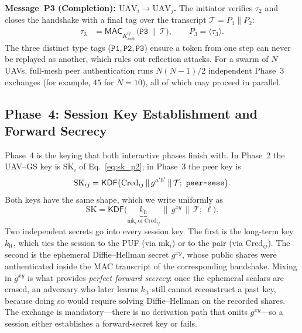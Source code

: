 \documentclass[11pt,a4paper]{article}
\begin{document}
\textbf{Message~P3 (Completion): $\text{UAV}_i \rightarrow \text{UAV}_j$.}
The initiator verifies $\tau_2$ and closes the handshake with a final tag over
the transcript $\mathcal{T}=P_1\|P_2$:
\begin{align}
\tau_3 &= \mathsf{MAC}_{K^{ij}_{\text{auth}}}\big(\texttt{P3}\,\|\,\mathcal{T}\big), \qquad
P_3 = \langle \tau_3 \rangle.
\end{align}
The three distinct type tags ($\texttt{P1},\texttt{P2},\texttt{P3}$) ensure a
token from one step can never be replayed as another, which rules out
reflection attacks. For a swarm of $N$ UAVs, full-mesh peer authentication runs
$N(N-1)/2$ independent Phase~3 exchanges (for example, $45$ for $N=10$), all of
which may proceed in parallel.

\subsection{Phase~4: Session Key Establishment and Forward Secrecy}
\label{subsec:phase4}

Phase~4 is the keying that both interactive phases finish with. In Phase~2 the
UAV--GS key is $\text{SK}_i$ of Eq.~\eqref{eq:sk_p2}; in Phase~3 the peer key is
\begin{equation}
\text{SK}_{ij} = \mathsf{KDF}\big(\text{Cred}_{ij}\,\|\,g^{a'b'}\,\|\,\mathcal{T};\ \texttt{peer\text{-}sess}\big).
\label{eq:sk_p3}
\end{equation}
Both keys have the same shape, which we write uniformly as
\begin{equation}
\text{SK} = \mathsf{KDF}\big(\underbrace{k_{\text{lt}}}_{\text{mk}_i\ \text{or}\ \text{Cred}_{ij}} \,\|\, g^{xy} \,\|\, \mathcal{T};\ \ell\big).
\label{eq:sk_unified}
\end{equation}
Two independent secrets go into every session key. The first is the long-term
key $k_{\text{lt}}$, which ties the session to the PUF (via $\text{mk}_i$) or to
the pair (via $\text{Cred}_{ij}$). The second is the ephemeral Diffie--Hellman
secret $g^{xy}$, whose public shares were authenticated inside the MAC
transcript of the corresponding handshake. Mixing in $g^{xy}$ is what provides
\emph{perfect forward secrecy}: once the ephemeral scalars are erased, an
adversary who later learns $k_{\text{lt}}$ still cannot reconstruct a past key,
because doing so would require solving Diffie--Hellman on the recorded shares.
The exchange is mandatory---there is no derivation path that omits $g^{xy}$---so
a session either establishes a forward-secret key or fails.
\end{document}
